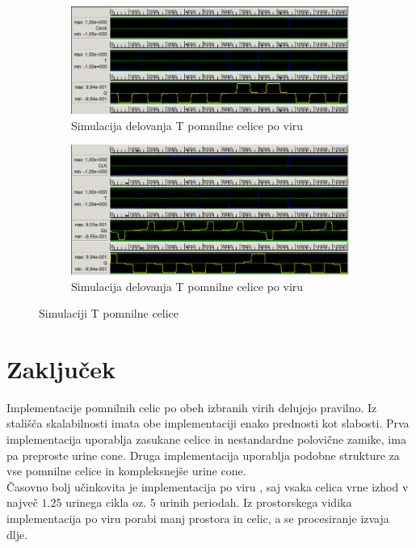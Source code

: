 \documentclass[a4paper, 11pt]{article}
\begin{document}
\begin{figure}[h!]
	\begin{subfigure}[b]{\textwidth}
	\includegraphics[width=\textwidth]{../img/vir_4/sim_t.png}
	\caption{Simulacija delovanja T pomnilne celice po viru \cite{quantum_dot}}
	\label{fig-t-1-sim}
	\end{subfigure}
	\begin{subfigure}[b]{\textwidth}
	\includegraphics[width=\textwidth]{../img/vir_5/sim_t.png}
	\caption{Simulacija delovanja T pomnilne celice po viru \cite{a_novel_approach}}
	\label{fig-t-2-sim}
	\end{subfigure}
	\caption{Simulaciji T pomnilne celice}
	\label{fig-t-sim}
\end{figure}

\section{Zaključek}
Implementacije pomnilnih celic po obeh izbranih virih delujejo pravilno.
Iz stališča skalabilnosti imata obe implementaciji enako prednosti kot slabosti. Prva implementacija uporablja zasukane celice in nestandardne polovične zamike, ima pa preproste urine cone. Druga implementacija uporablja podobne strukture za vse pomnilne celice in kompleksnejše urine cone.\\
Časovno bolj učinkovita je implementacija po viru \cite{quantum_dot}, saj vsaka celica vrne izhod v največ $1.25$ urinega cikla oz. $5$ urinih periodah. Iz prostorskega vidika implementacija po viru \cite{a_novel_approach} porabi manj prostora in celic, a se procesiranje izvaja dlje.

 
\end{document}
